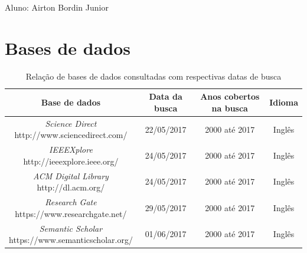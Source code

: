 \documentclass[a4paper,11pt]{article}
\begin{document}

\begin{framed}
\begin{center}
Aluno: Airton Bordin Junior
\end{center}
\end{framed}

\section{Bases de dados}
\begin{table}[ht]
\centering
\begin{tabular}{| c | c | c | c |}
\hline
\textbf{Base de dados} &  \textbf{Data da busca} & \textbf{Anos cobertos na busca} & \textbf{Idioma} \\
\hline
\makecell{\emph{Science Direct} \\ http://www.sciencedirect.com/} & 22/05/2017 & 2000 até 2017 & Inglês \\
\hline
\makecell{\emph{IEEEXplore} \\ http://ieeexplore.ieee.org/} & 24/05/2017 & 2000 até 2017 & Inglês \\
\hline
\makecell{\emph{ACM Digital Library} \\http://dl.acm.org/} & 24/05/2017 & 2000 até 2017 & Inglês \\
\hline
\makecell{\emph{Research Gate} \\ https://www.researchgate.net/} & 29/05/2017 & 2000 até 2017 & Inglês \\
\hline
\makecell{\emph{Semantic Scholar} \\ https://www.semanticscholar.org/} & 01/06/2017 & 2000 até 2017 & Inglês \\
\hline

\end{tabular}
\caption{Relação de bases de dados consultadas com respectivas datas de busca}
\label{tab:tab_bases}
\end{table}
\end{document}
